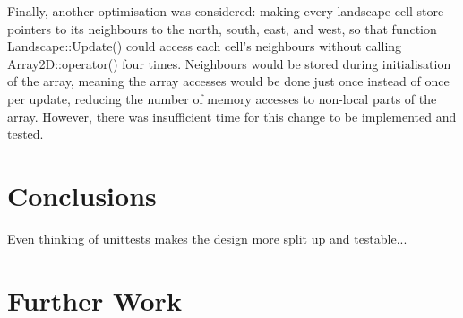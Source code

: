 \documentclass[12pt,a4paper]{article}
\begin{document}
Finally, another optimisation was considered: making every landscape cell store pointers to its neighbours to the north, south, east, and west, so that function Landscape::Update() could access each cell's neighbours without calling Array2D::operator() four times.
Neighbours would be stored during initialisation of the array, meaning the array accesses would be done just once instead of once per update, reducing the number of memory accesses to non-local parts of the array. However, there was insufficient time for this change to be implemented and tested.





\section{Conclusions}
\label{Conclusions}

Even thinking of unittests makes the design more split up and testable...



\section{Further Work}
\label{Further Work}
\end{document}
